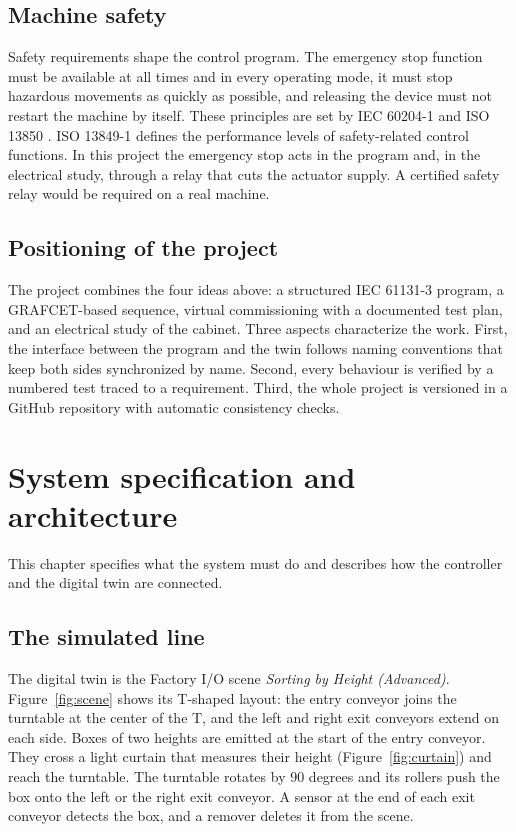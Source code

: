 \documentclass[11pt,a4paper]{report}
\begin{document}
\section{Machine safety}
Safety requirements shape the control program. The emergency stop function must be available at all times and in every operating mode, it must stop hazardous movements as quickly as possible, and releasing the device must not restart the machine by itself. These principles are set by IEC 60204-1 \cite{iec60204} and ISO 13850 \cite{iso13850}. ISO 13849-1 \cite{iso13849} defines the performance levels of safety-related control functions. In this project the emergency stop acts in the program and, in the electrical study, through a relay that cuts the actuator supply. A certified safety relay would be required on a real machine.

\section{Positioning of the project}
The project combines the four ideas above: a structured IEC 61131-3 program, a GRAFCET-based sequence, virtual commissioning with a documented test plan, and an electrical study of the cabinet. Three aspects characterize the work. First, the interface between the program and the twin follows naming conventions that keep both sides synchronized by name. Second, every behaviour is verified by a numbered test traced to a requirement. Third, the whole project is versioned in a GitHub repository with automatic consistency checks.

\chapter{System specification and architecture}\label{ch:spec}
This chapter specifies what the system must do and describes how the controller and the digital twin are connected.

\section{The simulated line}
The digital twin is the Factory I/O scene \emph{Sorting by Height (Advanced)}. Figure~\ref{fig:scene} shows its T-shaped layout: the entry conveyor joins the turntable at the center of the T, and the left and right exit conveyors extend on each side. Boxes of two heights are emitted at the start of the entry conveyor. They cross a light curtain that measures their height (Figure~\ref{fig:curtain}) and reach the turntable. The turntable rotates by 90 degrees and its rollers push the box onto the left or the right exit conveyor. A sensor at the end of each exit conveyor detects the box, and a remover deletes it from the scene.
\end{document}
